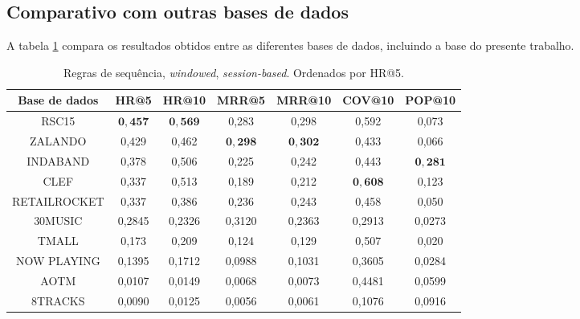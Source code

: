 \subsection{Comparativo com outras bases de dados}
A tabela \ref{tab:sr} compara os resultados obtidos entre as diferentes bases de
dados, incluindo a base do presente trabalho.

\begin{table}[htbp]
\centering
\vspace{1mm}
\begin{tabular}{ccccccc}
\hline
Base de dados & HR@5 & HR@10 & MRR@5 & MRR@10 & COV@10 & POP@10 \\
\hline
RSC15 & $\mathbf{0,457}$ & $\mathbf{0,569}$ & 0,283 & 0,298 & 0,592 & 0,073 \\
ZALANDO & 0,429 & 0,462 & $\mathbf{0,298}$ & $\mathbf{0,302}$ & 0,433 & 0,066 \\
INDABAND & 0,378 & 0,506 & 0,225 & 0,242 & 0,443 & $\mathbf{0,281}$ \\
CLEF & 0,337 & 0,513 & 0,189 & 0,212 & $\mathbf{0,608}$ & 0,123 \\
RETAILROCKET &  0,337 & 0,386 & 0,236 & 0,243 & 0,458 & 0,050 \\
30MUSIC & 0,2845 & 0,2326 & 0,3120  & 0,2363 & 0,2913 & 0,0273 \\
TMALL &  0,173 & 0,209 & 0,124 & 0,129 & 0,507 & 0,020 \\
NOW PLAYING & 0,1395 & 0,1712 & 0,0988 & 0,1031 & 0,3605 & 0,0284 \\
AOTM & 0,0107 & 0,0149 & 0,0068 & 0,0073 & 0,4481 & 0,0599 \\
8TRACKS & 0,0090 & 0,0125 & 0,0056 & 0,0061 & 0,1076 & 0,0916 \\
\hline
\end{tabular}
\caption{Regras de sequência, \textit{windowed}, \textit{session-based}. Ordenados por HR@5.}
\label{tab:sr}
\end{table}
